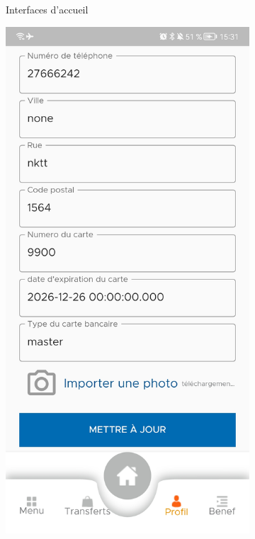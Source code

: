 \begin{itemize}[label=$\ast$]
\begin{figure}
\begin{subfigure}[b]{0.3\textwidth}
		\caption{Interfaces d’accueil}
		\label{fig:y equals x}
	\end{subfigure}
	\hfill
	\begin{subfigure}[b]{0.3\textwidth}
		\centering
		\includegraphics[width=\textwidth]{./Template LaTeX/Images/7.jpg}

\end{subfigure}
\end{figure}
\end{itemize}
